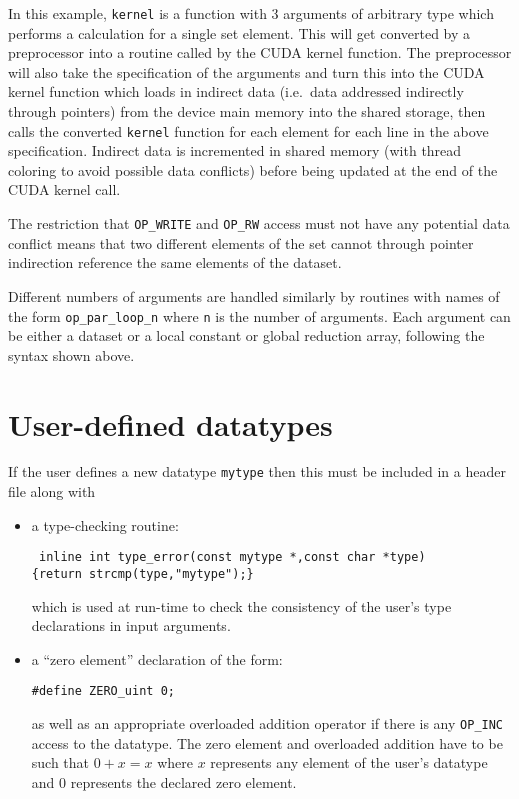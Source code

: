 \documentclass[11pt]{article}
\begin{document}
\noindent
In this example, {\tt kernel} is a function with 3 arguments of arbitrary type which
performs a calculation for a single set element.
This will get converted by a preprocessor into a routine called by the CUDA kernel 
function.  The preprocessor will also take the specification of the arguments and turn 
this into the CUDA kernel function which loads in indirect data (i.e.~data addressed 
indirectly through pointers) from the device main memory into the shared storage, 
then calls the converted {\tt kernel} function for each element for each line in 
the above specification.  Indirect data is incremented in shared memory (with
thread coloring to avoid possible data conflicts) before being updated at the end 
of the CUDA kernel call.

The restriction that {\tt OP\_WRITE} and {\tt OP\_RW} access must not have any 
potential data conflict means that two different elements of the set cannot 
through pointer indirection reference the same elements of the dataset.  


Different numbers of arguments are handled similarly by routines with names
of the form {\tt op\_par\_loop\_n} where {\tt n} is the number of arguments.
Each argument can be either a dataset or a local constant or global reduction 
array, following the syntax shown above.


\section{User-defined datatypes}

If the user defines a new datatype {\tt mytype} then this must be included in
a header file along with
\begin{itemize}
\item
a type-checking routine:

{\tt 
inline int type\_error(const mytype *,const char *type)\\
\{return strcmp(type,"mytype");\}
}

which is used at run-time to check the consistency of the user's type declarations
in input arguments.

\item

a ``zero element'' declaration of the form:

{\tt \#define ZERO\_uint    0;}

as well as an appropriate overloaded addition operator  if there is any 
{\tt OP\_INC} access to the datatype.  The zero element and overloaded 
addition have to be such that $0 + x = x$ where $x$ represents any element 
of the user's datatype and $0$ represents the declared zero element.

\end{itemize}
\end{document}
